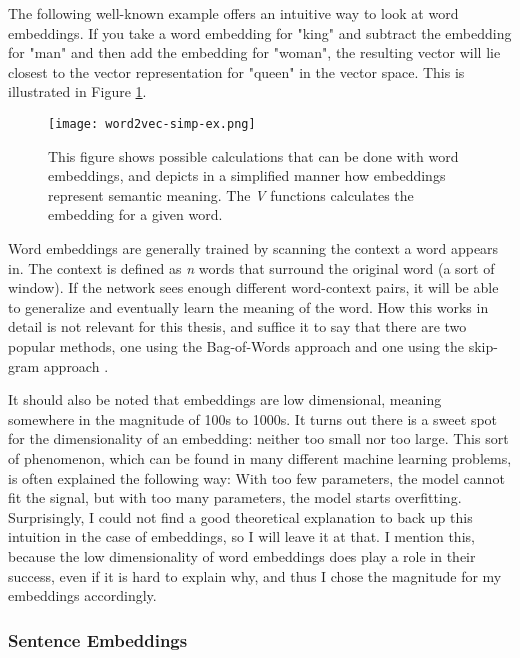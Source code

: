 The following well-known example offers an intuitive way to look at word embeddings. If you take a word embedding
for "king" and subtract the embedding for "man" and then add the embedding for "woman", the resulting vector will lie
closest to the vector representation for "queen" in the vector space. This is illustrated in Figure \ref{fig:w2vse}.

\begin{figure}
  \begin{center}
    \texttt{[image: word2vec-simp-ex.png]}
  \end{center}
  \captionsetup{width=.75\linewidth}
  \caption{This figure shows possible calculations that can be done with word embeddings, and depicts in a simplified manner how
  embeddings represent semantic meaning. The \textit{V} functions calculates the embedding for a given word.}
  \label{fig:w2vse}
\end{figure}

Word embeddings are generally trained by scanning the context a word appears in. The context is defined as \textit{n} words that
surround the original word (a sort of window). If the network sees enough different word-context pairs, it will be able to
generalize and eventually learn the meaning of the word. How this works in detail is not relevant for this thesis, and suffice it
to say that there are two popular methods, one using the Bag-of-Words \citep{word2vec} approach and one using the skip-gram
approach \citep{neg-sample}.

It should also be noted that embeddings are low dimensional, meaning somewhere in the magnitude of 100s to 1000s. It turns out
there is a sweet spot for the dimensionality of an embedding: neither too small nor too large. This sort of phenomenon, which
can be found in many different machine learning problems, is often explained the following way: With too few parameters, the model
cannot fit the signal, but with too many parameters, the model starts overfitting. Surprisingly, I could not find a good theoretical
explanation to back up this intuition in the case of embeddings, so I will leave it at that. I mention this, because the low
dimensionality of word embeddings does play a role in their success, even if it is hard to explain why, and thus I chose the
magnitude for my embeddings accordingly.


\subsubsection{Sentence Embeddings}


